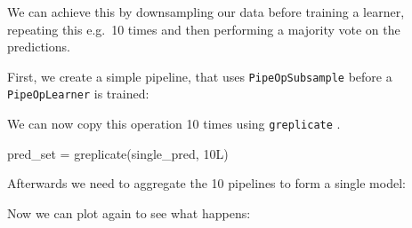 \documentclass[
  11pt,
  parskip=half,
  DIV=calc,
  BCOR=10mm,
  x11names]{scrbook}
\newenvironment{Shaded}{}{}
\newcommand{\CommentTok}[1]{\textcolor[rgb]{0.00,0.50,0.00}{#1}}
\newcommand{\DataTypeTok}[1]{#1}
\newcommand{\FloatTok}[1]{#1}
\newcommand{\KeywordTok}[1]{\textcolor[rgb]{0.00,0.00,1.00}{#1}}
\newcommand{\NormalTok}[1]{#1}
\newcommand{\OperatorTok}[1]{#1}
\newcommand{\OtherTok}[1]{\textcolor[rgb]{1.00,0.25,0.00}{#1}}
\newcommand{\StringTok}[1]{\textcolor[rgb]{0.00,0.50,0.50}{#1}}
\begin{document}
We can achieve this by downsampling our data before training a learner, repeating this e.g.~10 times and then performing a majority vote on the predictions.

First, we create a simple pipeline, that uses \texttt{PipeOpSubsample} before a \texttt{PipeOpLearner} is trained:

\begin{Shaded}
\end{Shaded}

We can now copy this operation 10 times using \texttt{greplicate} .

\begin{Shaded}
\begin{Highlighting}[]
\NormalTok{pred_set =}\StringTok{ }\KeywordTok{greplicate}\NormalTok{(single_pred, 10L)}
\end{Highlighting}
\end{Shaded}

Afterwards we need to aggregate the 10 pipelines to form a single model:

\begin{Shaded}
\end{Shaded}

Now we can plot again to see what happens:

\begin{Shaded}
\end{Shaded}
\end{document}
